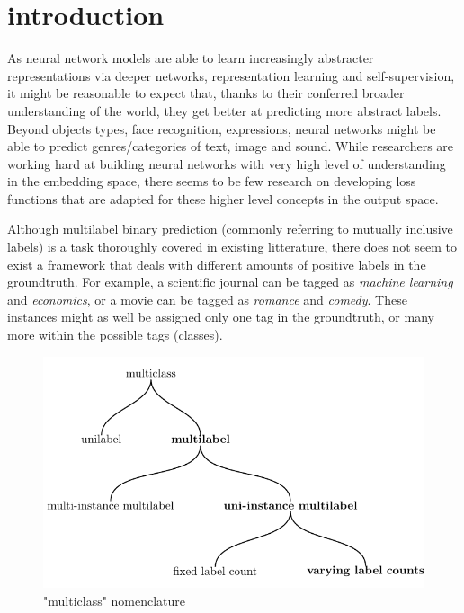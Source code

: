 
\section{introduction}
\label{sec:org662677c}

As neural network models are able to learn increasingly abstracter representations via deeper networks, representation learning and self-supervision, it might be reasonable to expect that, thanks to their conferred broader understanding of the world, they get better at predicting more abstract labels. Beyond objects types, face recognition, expressions, neural networks might be able to predict genres/categories  of text, image and sound. While researchers are working hard at building neural networks with very high level of understanding in the embedding space, there seems to be few research on developing loss functions that are adapted for these higher level concepts in the output space.

Although multilabel binary prediction (commonly referring to mutually inclusive labels) is a task thoroughly covered in existing litterature, there does not seem to exist a framework that deals with different amounts of positive labels in the groundtruth. For example, a scientific journal can be tagged as \emph{machine learning} and \emph{economics}, or a movie can be tagged as \emph{romance} and \emph{comedy}. These instances might as well be assigned only one tag in the groundtruth, or many more within the possible tags (classes).

\begin{figure}[htbp]
\centering
\includegraphics[width=.9\linewidth]{./tree/Tree.pdf}
\caption{\label{fig:tree}
"multiclass" nomenclature}
\end{figure}

